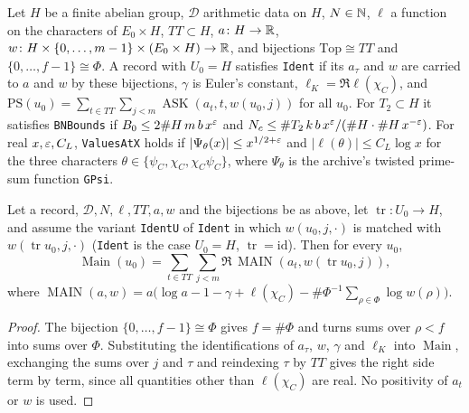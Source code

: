 \begin{definition}\label{geoa:ident}
Let $H$ be a finite abelian group, $\mathcal D$ arithmetic data on $H$, $N\in\mathbb{N}$,
$\ell$ a function on the characters of $E_0\times H$, $TT\subset H$, $a\colon H\to\mathbb{R}$,
$w\colon H\times\{0,\dots,m-1\}\times(E_0\times H)\to\mathbb{R}$, and bijections
$\mathrm{Top}\cong TT$ and $\{0,\dots,f-1\}\cong\Phi$. A record with $U_0=H$ satisfies
\texttt{Ident} if its $a_{\tau}$ and $w$ are carried to $a$ and $w$ by these bijections,
$\gamma$ is Euler's constant, $\ell_K=\Re\ell(\chi_C)$, and
$\mathrm{PS}(u_0)=\sum_{t\in TT}\sum_{j<m}\operatorname{ASK}(a_t,t,w(u_0,j))$ for all
$u_0$. For $T_2\subset H$ it satisfies \texttt{BNBounds} if
$B_0\le2\#H\,m\,b\,x^{\varepsilon}$ and $N_c\le\#T_2\,k\,b\,x^{\varepsilon}/(\#H\cdot\#H\,x^{-\varepsilon})$.
For real $x,\varepsilon,C_L$, \texttt{ValuesAtX} holds if
$|\Psi_{\theta}(x)|\le x^{1/2+\varepsilon}$ and $|\ell(\theta)|\le C_L\log x$ for the three
characters $\theta\in\{\psi_C,\chi_C,\chi_C\psi_C\}$, where $\Psi_{\theta}$ is the
archive's twisted prime-sum function \texttt{GPsi}.
\end{definition}

\begin{lemma}\label{geoa:main-eq}
Let a record, $\mathcal D,N,\ell,TT,a,w$ and the bijections be as above, let
$\operatorname{tr}\colon U_0\to H$, and assume the variant \texttt{IdentU} of
\texttt{Ident} in which $w(u_0,j,\cdot)$ is matched with $w(\operatorname{tr}u_0,j,\cdot)$
(\texttt{Ident} is the case $U_0=H$, $\operatorname{tr}=\mathrm{id}$). Then for every
$u_0$,
\[
\operatorname{Main}(u_0)=\sum_{t\in TT}\sum_{j<m}\Re\,\operatorname{MAIN}(a_t,w(\operatorname{tr}u_0,j)),
\]
where $\operatorname{MAIN}(a,w)=a\bigl(\log a-1-\gamma+\ell(\chi_C)-\#\Phi^{-1}\sum_{\rho\in\Phi}\log w(\rho)\bigr)$.
\end{lemma}
\begin{proof}
The bijection $\{0,\dots,f-1\}\cong\Phi$ gives $f=\#\Phi$ and turns sums over $\rho<f$
into sums over $\Phi$. Substituting the identifications of $a_{\tau}$, $w$, $\gamma$ and
$\ell_K$ into $\operatorname{Main}$, exchanging the sums over $j$ and $\tau$ and
reindexing $\tau$ by $TT$ gives the right side term by term, since all quantities other
than $\ell(\chi_C)$ are real. No positivity of $a_t$ or $w$ is used.
\end{proof}

